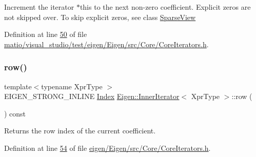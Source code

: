 Increment the iterator {\ttfamily $\ast$this} to the next non-\/zero coefficient. Explicit zeros are not skipped over. To skip explicit zeros, see class \hyperlink{group___sparse_core___module_class_eigen_1_1_sparse_view}{Sparse\+View} 

Definition at line \hyperlink{matio_2visual__studio_2test_2eigen_2_eigen_2src_2_core_2_core_iterators_8h_source_l00050}{50} of file \hyperlink{matio_2visual__studio_2test_2eigen_2_eigen_2src_2_core_2_core_iterators_8h_source}{matio/visual\+\_\+studio/test/eigen/\+Eigen/src/\+Core/\+Core\+Iterators.\+h}.

\mbox{\label{class_eigen_1_1_inner_iterator_a3ab6f3afdf62740623cdc9ecb14dc132}} 
\subsubsection{\texorpdfstring{row()}{row()}\hspace{0.1cm}{\footnotesize\ttfamily [1/2]}}
{\footnotesize\ttfamily template$<$typename Xpr\+Type $>$ \\
E\+I\+G\+E\+N\+\_\+\+S\+T\+R\+O\+N\+G\+\_\+\+I\+N\+L\+I\+NE \hyperlink{namespace_eigen_a62e77e0933482dafde8fe197d9a2cfde}{Index} \hyperlink{class_eigen_1_1_inner_iterator}{Eigen\+::\+Inner\+Iterator}$<$ Xpr\+Type $>$\+::row (\begin{DoxyParamCaption}{ }\end{DoxyParamCaption}) const\hspace{0.3cm}{\ttfamily [inline]}}

\begin{DoxyReturn}{Returns}
the row index of the current coefficient. 
\end{DoxyReturn}


Definition at line \hyperlink{eigen_2_eigen_2src_2_core_2_core_iterators_8h_source_l00054}{54} of file \hyperlink{eigen_2_eigen_2src_2_core_2_core_iterators_8h_source}{eigen/\+Eigen/src/\+Core/\+Core\+Iterators.\+h}.

\mbox{\label{class_eigen_1_1_inner_iterator_a3ab6f3afdf62740623cdc9ecb14dc132}} 
